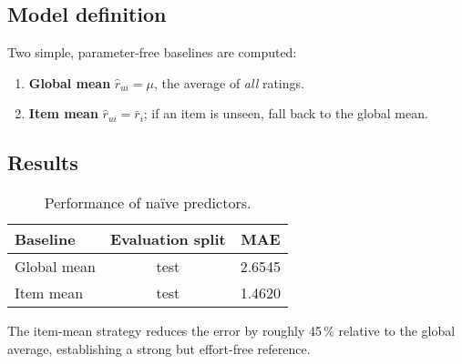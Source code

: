 \subsection*{Model definition}

Two simple, parameter-free baselines are computed:

\begin{enumerate}
  \item \textbf{Global mean}  
        \(\hat r_{ui} = \mu\), the average of \emph{all} ratings.
  \item \textbf{Item mean}  
        \(\hat r_{ui} = \bar r_{i}\); if an item is unseen, fall back to
        the global mean.
\end{enumerate}

\subsection*{Results}

\begin{table}[h]
  \centering
  \begin{tabular}{@{}lcc@{}}
    \toprule
    \textbf{Baseline} & \textbf{Evaluation split} & \textbf{MAE} \\ \midrule
    Global mean & test & 2.6545 \\
    Item mean   & test     & 1.4620 \\ \bottomrule
  \end{tabular}
  \caption{Performance of naïve predictors.}
  \label{tab:naive}
\end{table}

The item-mean strategy reduces the error by roughly 45\,\% relative to the
global average, establishing a strong but effort-free reference.
